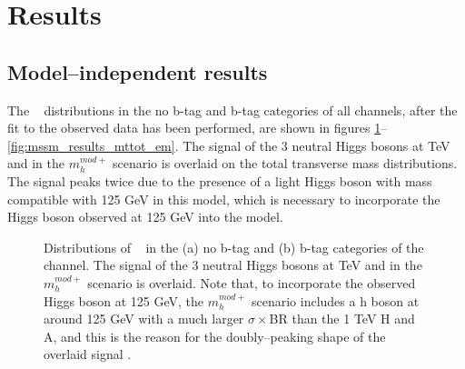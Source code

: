 \section{Results}
\label{sec:mssm_results}

\subsection{Model--independent results}
\label{sec:mssm_results_modelindep}
The \mTtot~ distributions in the no b-tag and b-tag
categories of all channels, after the fit to the observed
data has been performed, are shown in figures \ref{fig:mssm_results_mttot_mt}--\ref{fig:mssm_results_mttot_em}.
The signal of the 3 neutral Higgs bosons at  TeV and  in the $m_{h}^{mod+}$ scenario is overlaid 
on the total transverse mass distributions. The signal peaks twice due to the presence of a light Higgs boson
with mass compatible with 125 GeV in this model, which is necessary to incorporate the Higgs boson
observed at 125 GeV into the model.

\begin{figure}[h!]
\begin{center}
\end{center}
\caption{Distributions of \mTtot~ in the (a) no b-tag and (b) b-tag categories 
of the \mutau channel. The signal of the 3 neutral Higgs bosons at  TeV 
and  in the $m_{h}^{mod+}$ scenario is overlaid. Note that, to incorporate
the observed Higgs boson at 125 GeV, the $m_{h}^{mod+}$ scenario includes a h boson
at around 125 GeV with a much larger $\sigma \times$BR than the 1 TeV H and A, and this is
the reason for the doubly--peaking shape of the overlaid signal \cite{CMS-PAS-HIG-16-037}.}
\label{fig:mssm_results_mttot_mt}
\end{figure}

